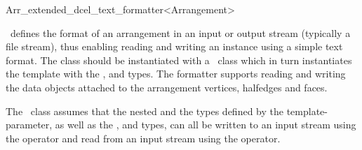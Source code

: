 
\ccRefPageBegin

\begin{ccRefClass}{Arr_extended_dcel_text_formatter<Arrangement>}

\ccDefinition

\ccRefName\ defines the format of an arrangement in an input or output stream
(typically a file stream), thus enabling reading and writing an 
instance using a simple text format. The  class should be
instantiated with a \dcel\ class which in turn instantiates the
 template with the ,  and
 types.
The formatter supports reading and writing the data objects attached to the
arrangement vertices, halfedges and faces.

The \ccRefName\ class assumes that the nested  and the  types
defined by the  template-parameter, as well as the ,
 and  types, can all be written to an input stream using
the \ccc{<<} operator and read from an input stream using the \ccc{>>} operator.


\ccIsModel
     \\

\ccSeeAlso
     \\
     \\

\end{ccRefClass}

\ccRefPageEnd
